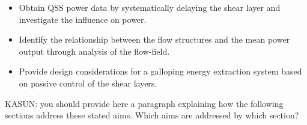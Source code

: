   \begin{itemize}
  	\item Obtain QSS power data by systematically delaying the shear layer and investigate the influence on power.
  	\item Identify the relationship between the flow structures and the mean power output through analysis of the flow-field.
  	\item Provide design considerations for a galloping energy extraction system based on passive control of the shear layers. 
  \end{itemize}
 
KASUN: you should provide here a paragraph explaining how the following sections address these stated aims. Which aims are addressed by which section?